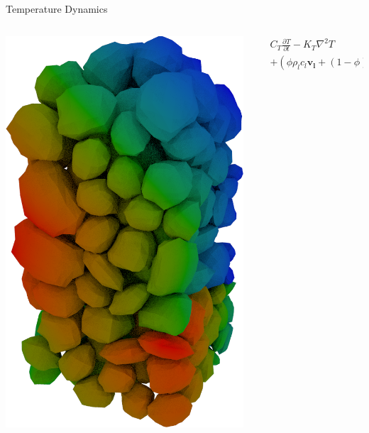 \documentclass{beamer}
\begin{document}
\begin{frame}{Temperature Dynamics}
\begin{columns}
\begin{column}{0.4\textwidth}
\includegraphics[width=0.9\columnwidth]{figure/poromechhot}
\end{column}
\begin{column}{0.4\textwidth}
	\begin{align*}
 	& C_T\frac{\partial T}{\partial t} - K_T \nabla^2 T \\ 
 	& +\left(  \phi\rho_l c_l \mathbf{v_l} 
 	+  (1 - \phi)\rho_s c_s \mathbf{v_s} \right)\cdot \nabla T
 	= Q\,.
 \end{align*}
\end{column}
\end{columns}
\end{frame}
\end{document}
